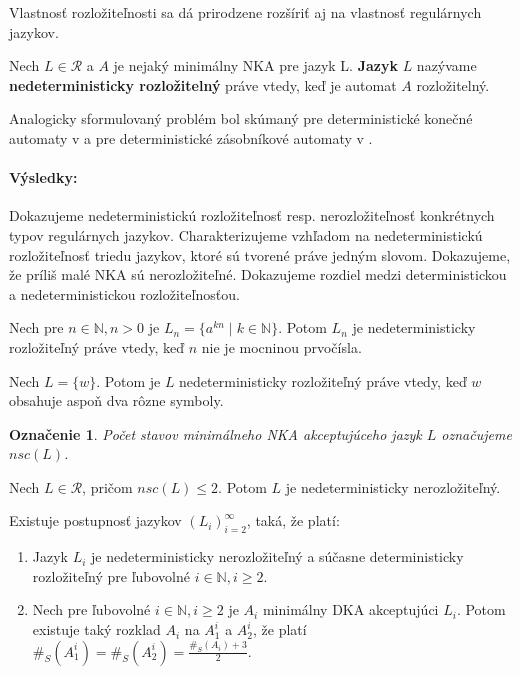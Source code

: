 \documentclass{svk_short_sk}
\newtheorem{notation}{Označenie}
\begin{document}
Vlastnosť rozložiteľnosti sa dá prirodzene rozšíriť aj na vlastnosť regulárnych jazykov.

\begin{definition}
\label{def:nedeterministic_decomposability_of_language}
Nech $ L \in \mathscr{R} $ a $ A $ je nejaký minimálny NKA pre jazyk L. \textbf{Jazyk} $ L $ nazývame \textbf{nedeterministicky rozložitelný} práve vtedy, keď je automat $ A $ rozložitelný.
\end{definition}

Analogicky sformulovaný problém bol skúmaný pre deterministické konečné automaty v \cite{Gazi} a pre deterministické zásobníkové automaty v \cite{Labath}.

\paragraph*{Výsledky:}

Dokazujeme nedeterministickú rozložiteľnosť resp. nerozložiteľnosť konkrétnych typov regulárnych jazykov. Charakterizujeme vzhľadom na nedeterministickú rozložiteľnosť triedu jazykov, ktoré sú tvorené práve jedným slovom. Dokazujeme, že príliš malé NKA sú nerozložiteľné. Dokazujeme rozdiel medzi deterministickou a nedeterministickou rozložiteľnosťou.

\begin{theorem}
\label{thm:primes_compounds}
Nech pre $ n \in \mathbb{N}, n > 0 $ je $ L_n = \lbrace a^{kn} \; | \; k \in \mathbb{N} \rbrace $. Potom $ L_n $ je nedeterministicky rozložiteľný práve vtedy, keď $ n $ nie je mocninou prvočísla.
\end{theorem}

\begin{theorem}
\label{thm:singleton_characterization}
Nech $ L = \lbrace w \rbrace $. Potom je $ L $ nedeterministicky rozložiteľný práve vtedy, keď $ w $ obsahuje aspoň dva rôzne symboly.
\end{theorem}

\begin{notation}
Počet stavov minimálneho NKA akceptujúceho jazyk $ L $ označujeme \em{}$ nsc(L) $\em{}.
\end{notation}

\begin{theorem}
\label{thm:too_small_nsc}
Nech $ L \in \mathscr{R} $, pričom $ nsc(L) \leq 2 $. Potom $ L $ je nedeterministicky nerozložiteľný.
\end{theorem}

\begin{theorem}
\label{thm:ndet_vs_det_diff_big}
Existuje postupnosť jazykov $  (L_i)_{i=2}^{\infty} $, taká, že platí:
\begin{enumerate}[label=(\alph*)]
\item Jazyk $ L_i $ je nedeterministicky nerozložiteľný a súčasne deterministicky rozložiteľný pre ľubovolné $ i \in \mathbb{N}, i \geq 2 $.
\item Nech pre ľubovolné $ i \in \mathbb{N}, i \geq 2 $ je $ A_i $ minimálny DKA akceptujúci $ L_i $. Potom existuje taký rozklad $ A_i $ na $ A_1^i $ a $ A_2^i $, že platí $ \#_S(A_1^i)=\#_S(A_2^i)=\frac{\#_S(A_i)+3}{2} $.
\end{enumerate}
\end{theorem}

 



\end{document}
